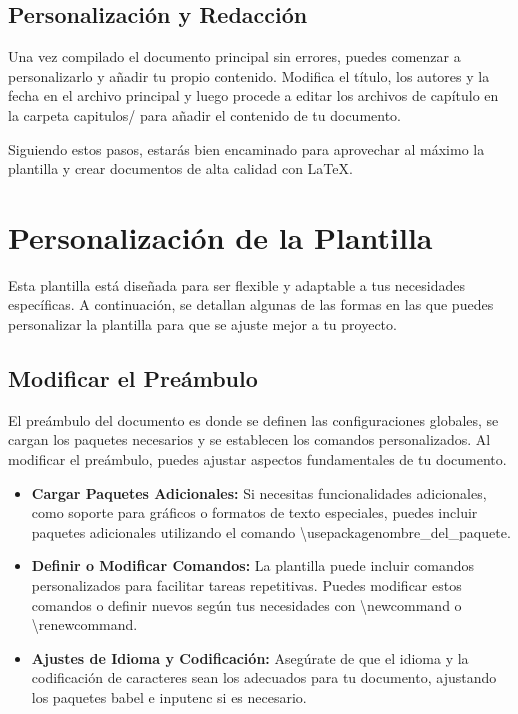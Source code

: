 \documentclass[11pt]{article}
\begin{document}
\subsection{Personalización y Redacción}

Una vez compilado el documento principal sin errores, puedes comenzar a personalizarlo y añadir tu propio contenido. Modifica el título, los autores y la fecha en el archivo principal y luego procede a editar los archivos de capítulo en la carpeta capitulos/ para añadir el contenido de tu documento.

Siguiendo estos pasos, estarás bien encaminado para aprovechar al máximo la plantilla y crear documentos de alta calidad con \LaTeX.

\section{Personalización de la Plantilla}

Esta plantilla está diseñada para ser flexible y adaptable a tus necesidades específicas. A continuación, se detallan algunas de las formas en las que puedes personalizar la plantilla para que se ajuste mejor a tu proyecto.

\subsection{Modificar el Preámbulo}

El preámbulo del documento es donde se definen las configuraciones globales, se cargan los paquetes necesarios y se establecen los comandos personalizados. Al modificar el preámbulo, puedes ajustar aspectos fundamentales de tu documento.

\begin{itemize}
\item \textbf{Cargar Paquetes Adicionales:} Si necesitas funcionalidades adicionales, como soporte para gráficos o formatos de texto especiales, puedes incluir paquetes adicionales utilizando el comando \textbackslash usepackage{nombre\_del\_paquete}.
\item \textbf{Definir o Modificar Comandos:} La plantilla puede incluir comandos personalizados para facilitar tareas repetitivas. Puedes modificar estos comandos o definir nuevos según tus necesidades con \textbackslash newcommand o \textbackslash renewcommand.
\item \textbf{Ajustes de Idioma y Codificación:} Asegúrate de que el idioma y la codificación de caracteres sean los adecuados para tu documento, ajustando los paquetes babel e inputenc si es necesario.
\end{itemize}
\end{document}

